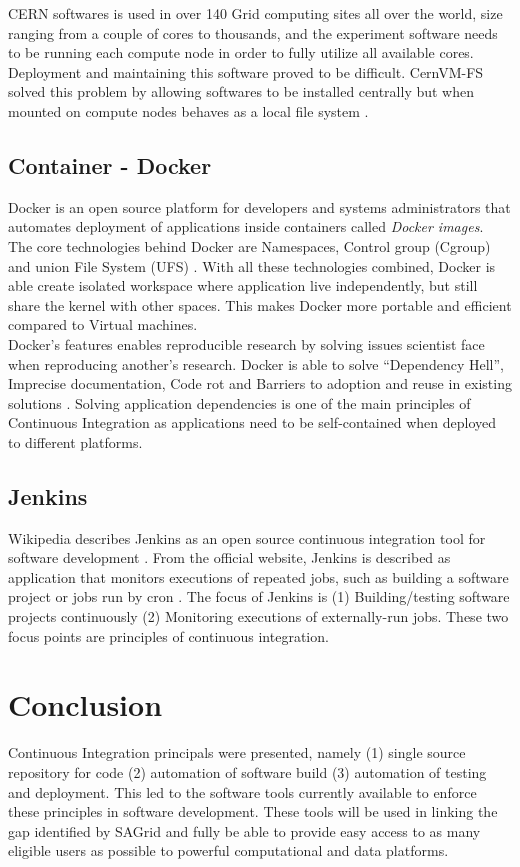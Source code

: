 \documentclass [titlepage,11pt]{article}
\begin{document}
CERN softwares is used in over 140 Grid computing sites all over the world, size ranging from a couple of cores to thousands, and the experiment software needs to be running each compute node in order to fully utilize all available cores. Deployment and maintaining this software proved to be difficult. CernVM-FS solved this problem by allowing softwares to be installed centrally but when mounted on compute nodes behaves as a local file system \citep{jakob11}.  

\subsection{Container - Docker}
Docker is an open source platform for developers and systems administrators that automates deployment of applications inside containers called {\it Docker images}. The core technologies behind Docker are Namespaces, Control group (Cgroup) and union File System (UFS) \citep{lui14}. With all these technologies combined, Docker is able create isolated workspace where application live independently, but still share the kernel with other spaces. This makes Docker more portable and efficient compared to Virtual machines. \\

Docker's features enables reproducible research by solving issues scientist face when reproducing another's research. Docker is able to solve ``Dependency Hell'', Imprecise documentation, Code rot and Barriers to adoption and reuse in existing solutions \citep{carl15}. Solving application dependencies is one of the main principles of Continuous Integration as applications need to be self-contained when deployed to different platforms.


\subsection{Jenkins}
Wikipedia describes Jenkins as an open source continuous integration tool for software development \citep{wiki11}. From the official website, Jenkins is described as application that monitors executions of repeated jobs, such as building a software project or jobs run by cron \citep{jenkins15}. The focus of Jenkins is (1) Building/testing software projects continuously (2) Monitoring executions of externally-run jobs. These two focus points are principles of continuous integration. 
\clearpage

\section{Conclusion}
Continuous Integration principals were presented, namely (1) single source repository for code (2) automation of software build (3) automation of testing and deployment. This led to the software tools currently available to enforce these principles in software development. These tools will be used in linking the gap identified by SAGrid and fully be able to provide easy access to as many eligible users as possible to powerful computational and data platforms. 


\end{document}
